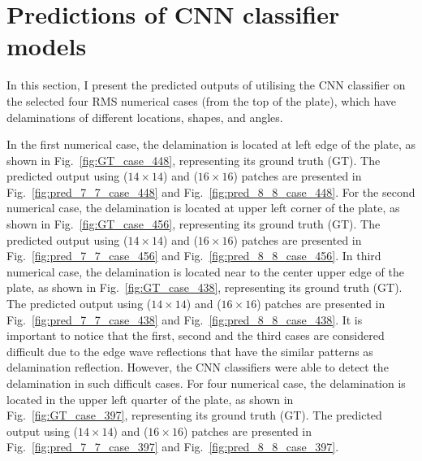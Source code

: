 \section{Predictions of CNN classifier models}
\label{sec51}

In this section, I present the predicted outputs of utilising the CNN classifier on the selected four RMS numerical cases (from the top of the plate), which have delaminations of different locations, shapes, and angles.

In the first numerical case, the delamination is located at left edge of the plate, as shown in Fig.~\ref{fig:GT_case_448}, representing its ground truth (GT).
The predicted output using (\(14\times14\)) and (\(16\times16\)) patches are presented in Fig.~\ref{fig:pred_7_7_case_448} and Fig.~\ref{fig:pred_8_8_case_448}.
For the second numerical case, the delamination is located at upper left corner of the plate, as shown in Fig.~\ref{fig:GT_case_456}, representing its ground truth (GT).
The predicted output using (\(14\times14\)) and (\(16\times16\)) patches are presented in Fig.~\ref{fig:pred_7_7_case_456} and Fig.~\ref{fig:pred_8_8_case_456}.
In third numerical case, the delamination is located near to the center upper edge of the plate, as shown in Fig.~\ref{fig:GT_case_438}, representing its ground truth (GT).
The predicted output using (\(14\times14\)) and (\(16\times16\)) patches are presented in Fig.~\ref{fig:pred_7_7_case_438} and Fig.~\ref{fig:pred_8_8_case_438}.
It is important to notice that the first, second and the third cases are considered difficult due to the edge wave reflections that have the similar patterns as delamination reflection.
However, the CNN classifiers were able to detect the delamination in such difficult cases.
For four numerical case, the delamination is located in the upper left quarter of the plate, as shown in Fig.~\ref{fig:GT_case_397}, representing its ground truth (GT).
The predicted output using (\(14\times14\)) and (\(16\times16\)) patches are presented in Fig.~\ref{fig:pred_7_7_case_397} and Fig.~\ref{fig:pred_8_8_case_397}.

